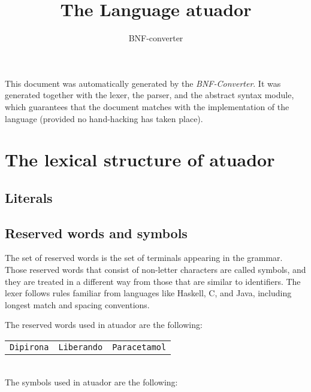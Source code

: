 \documentclass[a4paper,11pt]{article}
\author{BNF-converter}
\title{The Language atuador}
\begin{document}
\maketitle

\newcommand{\emptyP}{\mbox{$\epsilon$}}
\newcommand{\terminal}[1]{\mbox{{\texttt {#1}}}}
\newcommand{\nonterminal}[1]{\mbox{$\langle \mbox{{\sl #1 }} \! \rangle$}}
\newcommand{\arrow}{\mbox{::=}}
\newcommand{\delimit}{\mbox{$|$}}
\newcommand{\reserved}[1]{\mbox{{\texttt {#1}}}}
\newcommand{\literal}[1]{\mbox{{\texttt {#1}}}}
\newcommand{\symb}[1]{\mbox{{\texttt {#1}}}}

This document was automatically generated by the {\em BNF-Converter}. It was generated together with the lexer, the parser, and the abstract syntax module, which guarantees that the document matches with the implementation of the language (provided no hand-hacking has taken place).

\section*{The lexical structure of atuador}

\subsection*{Literals}


\subsection*{Reserved words and symbols}
The set of reserved words is the set of terminals appearing in the grammar. Those reserved words that consist of non-letter characters are called symbols, and they are treated in a different way from those that are similar to identifiers. The lexer follows rules familiar from languages like Haskell, C, and Java, including longest match and spacing conventions.

The reserved words used in atuador are the following: \\

\begin{tabular}{lll}
{\reserved{Dipirona}} &{\reserved{Liberando}} &{\reserved{Paracetamol}} \\
\end{tabular}\\

The symbols used in atuador are the following: \\
\end{document}
